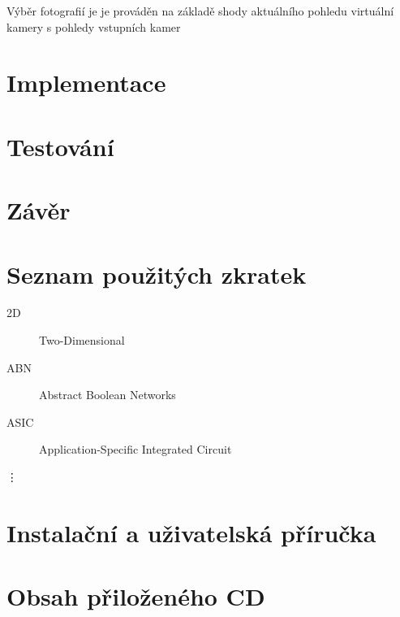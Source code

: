 \documentclass[11pt,twoside,a4paper]{book}
\begin{document}
Výběr fotografií je je prováděn na základě shody aktuálního pohledu virtuální kamery s pohledy vstupních kamer

\chapter{Implementace}

\chapter{Testování}

\chapter{Závěr}


\renewcommand\refname{Zdroje}

\def\CS{$\cal C\kern-0.1667em\lower.5ex\hbox{$\cal S$}\kern-0.075em $}



\appendix


\chapter{Seznam použitých zkratek}

\begin{description}
\item[2D] Two-Dimensional
\item[ABN] Abstract Boolean Networks
\item[ASIC] Application-Specific Integrated Circuit
\end{description}
\vdots

\chapter{Instalační a uživatelská příručka}

\chapter{Obsah přiloženého CD}
\end{document}
